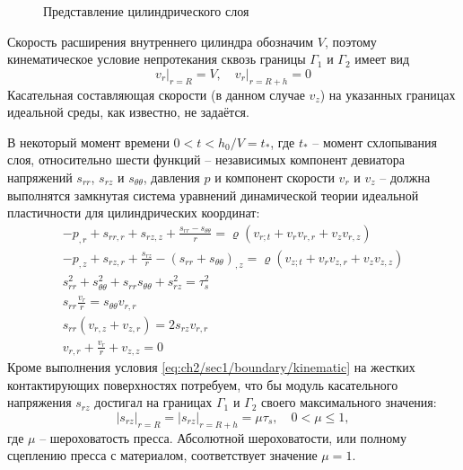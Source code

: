 \begin{figure}[ht]
    \caption{Представление цилиндрического слоя}
    \label{fig:ch2/layer}
\end{figure}
Скорость расширения внутреннего цилиндра обозначим $V$, поэтому кинематическое условие непротекания сквозь границы $\Gamma_{1}$ и $\Gamma_{2}$ имеет вид
\begin{equation}
  \label{eq:ch2/sec1/boundary/kinematic}
  v_{r}\lvert_{r=R} = V, \quad v_{r}\lvert_{r=R+h} = 0
\end{equation}
Касательная составляющая скорости (в данном случае $v_{z}$) на указанных границах идеальной среды, как известно, не задаётся.

В некоторый момент времени $0 < t < h_{0}/V = t_*$, где $t_*$ -- момент схлопывания слоя, относительно шести функций -- независимых компонент девиатора напряжений $s_{rr}$, $s_{rz}$ и $s_{\theta\theta}$, давления $p$ и компонент скорости $v_{r}$ и $v_{z}$ -- должна выполнятся замкнутая система уравнений динамической теории идеальной пластичности для цилиндрических координат:
\begin{subequations}
  \label{eqs:ch2/sec1/general}
  \begin{gather}
    \label{eqs:ch2/sec1/general/motion:1}
    -p_{,r}+s_{rr,r}+s_{rz,z}+\frac{s_{rr}-s_{\theta\theta}}{r} = \varrho \left(v_{r;t}+v_{r} v_{r,r} + v_{z} v_{r,z} \right)
    \\
    \label{eqs:ch2/sec1/general/motion:2}
    -p_{,z}+s_{rz,r}+\frac{s_{rz}}{r}-(s_{rr}+s_{\theta\theta})_{,z} = \varrho \left(v_{z;t}+v_{r} v_{z,r} + v_{z} v_{z,z} \right)
    \\
    \label{eqs:ch2/sec1/general/plasticity}
    s^2_{rr}+s^2_{\theta\theta}+s_{rr} s_{\theta\theta} + s^2_{rz}=\tau^2_{s}
    \\
    \label{eqs:ch2/sec1/general/coax:1}
    s_{rr} \frac{v_{r}}{r} = s_{\theta\theta} v_{r,r}
    \\
    \label{eqs:ch2/sec1/general/coax:2}
    s_{rr} (v_{r,z}+v_{z,r}) = 2 s_{rz} v_{r,r}
    \\
    \label{eqs:ch2/sec1/general/uncompress}
    v_{r,r}+\frac{v_{r}}{r}+v_{z,z} = 0
  \end{gather}
\end{subequations}
Кроме выполнения условия \cref{eq:ch2/sec1/boundary/kinematic} на жестких контактирующих поверхностях потребуем, что бы модуль касательного напряжения $s_{rz}$ достигал на границах $\Gamma_{1}$ и $\Gamma_{2}$ своего максимального значения:
\begin{equation}
  \label{eq:ch2/sec1/boundary/force}
  \lvert s_{rz}\lvert_{r=R} = \lvert s_{rz}\lvert_{r=R+h} = \mu \tau_{s}, \quad 0 < \mu \le 1,
\end{equation}
где $\mu$ -- шероховатость пресса. Абсолютной шероховатости, или полному сцеплению пресса с материалом, соответствует значение $\mu = 1$.

